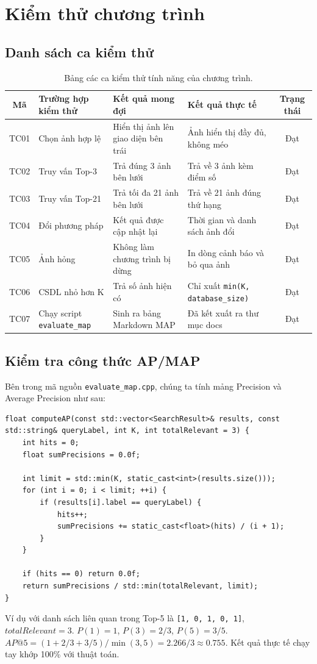 \chapter{Kiểm thử chương trình}

\section{Danh sách ca kiểm thử}
\begin{table}[H]
\centering
\begin{tabularx}{\textwidth}{|c|l|X|X|c|}
\hline
\textbf{Mã} & \textbf{Trường hợp kiểm thử} & \textbf{Kết quả mong đợi} & \textbf{Kết quả thực tế} & \textbf{Trạng thái} \\
\hline
TC01 & Chọn ảnh hợp lệ & Hiển thị ảnh lên giao diện bên trái & Ảnh hiển thị đầy đủ, không méo & Đạt \\
\hline
TC02 & Truy vấn Top-3 & Trả đúng 3 ảnh bên lưới & Trả về 3 ảnh kèm điểm số & Đạt \\
\hline
TC03 & Truy vấn Top-21 & Trả tối đa 21 ảnh bên lưới & Trả về 21 ảnh đúng thứ hạng & Đạt \\
\hline
TC04 & Đổi phương pháp & Kết quả được cập nhật lại & Thời gian và danh sách ảnh đổi & Đạt \\
\hline
TC05 & Ảnh hỏng & Không làm chương trình bị dừng & In dòng cảnh báo và bỏ qua ảnh & Đạt \\
\hline
TC06 & CSDL nhỏ hơn K & Trả số ảnh hiện có & Chỉ xuất \texttt{min(K, database\_size)} & Đạt \\
\hline
TC07 & Chạy script \texttt{evaluate\_map} & Sinh ra bảng Markdown MAP & Đã kết xuất ra thư mục docs & Đạt \\
\hline
\end{tabularx}
\caption{Bảng các ca kiểm thử tính năng của chương trình.}
\end{table}

\section{Kiểm tra công thức AP/MAP}
Bên trong mã nguồn \texttt{evaluate\_map.cpp}, chúng ta tính mảng Precision và Average Precision như sau:
\begin{verbatim}
float computeAP(const std::vector<SearchResult>& results, const std::string& queryLabel, int K, int totalRelevant = 3) {
    int hits = 0;
    float sumPrecisions = 0.0f;
    
    int limit = std::min(K, static_cast<int>(results.size()));
    for (int i = 0; i < limit; ++i) {
        if (results[i].label == queryLabel) {
            hits++;
            sumPrecisions += static_cast<float>(hits) / (i + 1);
        }
    }
    
    if (hits == 0) return 0.0f;
    return sumPrecisions / std::min(totalRelevant, limit);
}
\end{verbatim}
Ví dụ với danh sách liên quan trong Top-5 là \texttt{[1, 0, 1, 0, 1]}, $totalRelevant=3$.
$P(1) = 1$, $P(3) = 2/3$, $P(5) = 3/5$.
$AP@5 = (1 + 2/3 + 3/5) / \min(3, 5) = 2.266 / 3 \approx 0.755$. Kết quả thực tế chạy tay khớp 100\% với thuật toán.
